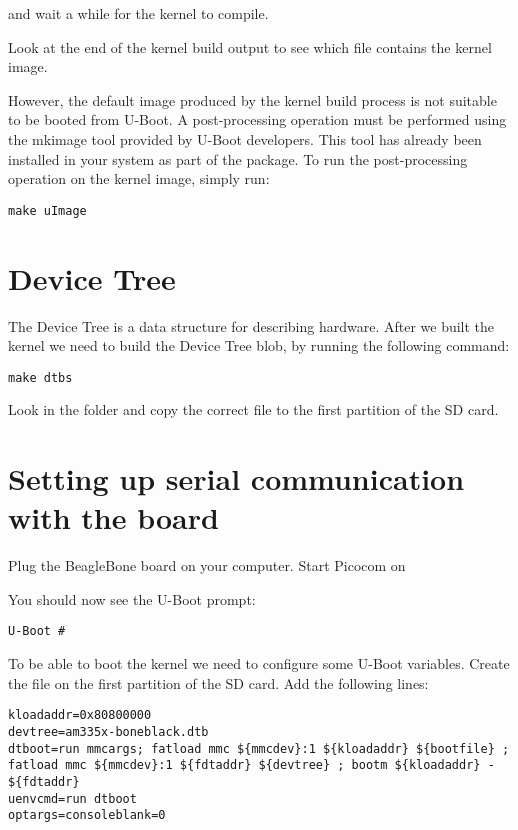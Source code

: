 and wait a while for the kernel to compile.

Look at the end of the kernel build output to see which file contains
the kernel image.

However, the default image produced by the kernel build process is not
suitable to be booted from U-Boot. A post-processing operation must be
performed using the mkimage tool provided by U-Boot developers. This
tool has already been installed in your system as part of the
 package. To run the post-processing operation on
the kernel image, simply run:

\begin{verbatim}
make uImage
\end{verbatim}

\section{Device Tree}
The Device Tree is a data structure for describing hardware.
After we built the kernel we need to build the Device Tree blob,
by running the following command:

\begin{verbatim}
make dtbs
\end{verbatim}

Look in the  folder and copy the correct  file to the first partition of the SD card.

\section{Setting up serial communication with the board}

Plug the BeagleBone board on your computer. Start Picocom on 

You should now see the U-Boot prompt:

\begin{verbatim}
U-Boot #
\end{verbatim}

To be able to boot the kernel we need to configure some U-Boot variables.
Create the file  on the first partition of the SD card.
Add the following lines:

\begin{verbatim}
kloadaddr=0x80800000
devtree=am335x-boneblack.dtb
dtboot=run mmcargs; fatload mmc ${mmcdev}:1 ${kloadaddr} ${bootfile} ; fatload mmc ${mmcdev}:1 ${fdtaddr} ${devtree} ; bootm ${kloadaddr} - ${fdtaddr}
uenvcmd=run dtboot
optargs=consoleblank=0
\end{verbatim}

